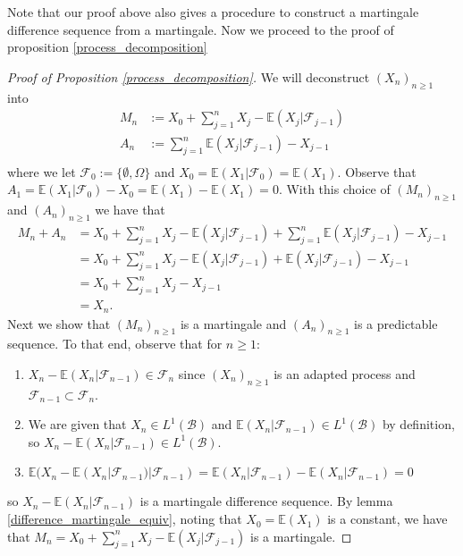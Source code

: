 Note that our proof above also gives a procedure to construct a martingale difference sequence from a martingale. Now we proceed to the proof of proposition \ref{process_decomposition}
\begin{proof}[Proof of Proposition \ref{process_decomposition}]
    We will deconstruct \((X_{n})_{n \geq 1}\) into
    \begin{align*}
        M_{n} &:= X_{0} + \sum\limits_{j=1}^{n} X_{j} - \mathbb{E}(X_{j}|\mathcal{F}_{j-1}) \\
        A_{n} &:=  \sum\limits_{j=1}^{n} \mathbb{E}(X_{j}|\mathcal{F}_{j-1}) - X_{j-1} \\
    \end{align*}
    where we let \(\mathcal{F}_{0} := \{\emptyset, \Omega\}\) and \(X_{0} = \mathbb{E}(X_{1}|\mathcal{F}_{0}) = \mathbb{E}(X_{1})\). Observe that \(A_{1} = \mathbb{E}(X_{1}|\mathcal{F}_{0}) - X_{0} = \mathbb{E}(X_{1}) - \mathbb{E}(X_{1}) = 0\). With this choice of \((M_{n})_{n \geq 1}\) and \((A_{n})_{n \geq 1}\) we have that
    \begin{align*}
        M_{n} + A_{n} &= X_{0} + \sum\limits_{j=1}^{n} X_{j} - \mathbb{E}(X_{j}|\mathcal{F}_{j-1}) + \sum\limits_{j=1}^{n} \mathbb{E}(X_{j}|\mathcal{F}_{j-1}) - X_{j-1} \\
        &=  X_{0} + \sum\limits_{j=1}^{n} X_{j} - \mathbb{E}(X_{j}|\mathcal{F}_{j-1}) + \mathbb{E}(X_{j}|\mathcal{F}_{j-1}) - X_{j-1} \\
        &= X_{0} + \sum\limits_{j=1}^{n} X_{j} - X_{j-1} \\
        &= X_{n}.
    \end{align*}
    Next we show that \((M_{n})_{n \geq 1}\) is a martingale and \((A_{n})_{n \geq 1}\) is a predictable sequence. To that end, observe that for \(n \geq 1\):
    \begin{enumerate}
        \item \(X_{n} - \mathbb{E}(X_{n}|\mathcal{F}_{n-1}) \in \mathcal{F}_{n}\) since \((X_{n})_{n \geq 1}\) is an adapted process and \(\mathcal{F}_{n-1} \subset \mathcal{F}_{n}\).
        \item We are given that \(X_{n} \in L^{1}(\mathcal{B})\) and \(\mathbb{E}(X_{n}|\mathcal{F}_{n-1})\in L^{1}(\mathcal{B})\) by definition, so \(X_{n} - \mathbb{E}(X_{n}|\mathcal{F}_{n-1}) \in L^{1}(\mathcal{B})\).
        \item \(\mathbb{E}(X_{n} - \mathbb{E}(X_{n}|\mathcal{F}_{n-1})|\mathcal{F}_{n-1})= \mathbb{E}(X_{n}|\mathcal{F}_{n-1}) - \mathbb{E}(X_{n}|\mathcal{F}_{n-1}) = 0\)
    \end{enumerate}
    so \(X_{n} - \mathbb{E}(X_{n}|\mathcal{F}_{n-1})\) is a martingale difference sequence. By lemma \ref{difference_martingale_equiv}, noting that \(X_{0} = \mathbb{E}(X_{1})\) is a constant, we have that \( M_{n} = X_{0} + \sum\limits_{j=1}^{n} X_{j} - \mathbb{E}(X_{j}|\mathcal{F}_{j-1})\) is a martingale.


\end{proof}
